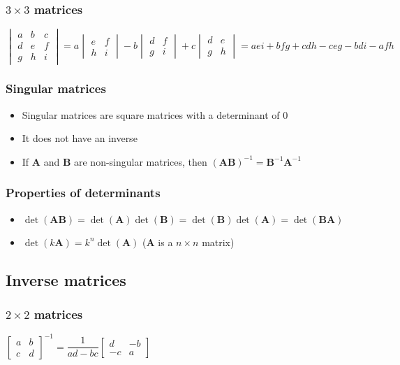 \subsubsection{$3\times3$ matrices}

$\begin{vmatrix}a&b&c\\d&e&f\\g&h&i\end{vmatrix}=a\begin{vmatrix}e&f\\h&i\end{vmatrix}-b\begin{vmatrix}d&f\\g&i\end{vmatrix}+c\begin{vmatrix}d&e\\g&h\end{vmatrix}=aei+bfg+cdh-ceg-bdi-afh$

\subsubsection{Singular matrices}
\begin{itemize}
	\item Singular matrices are square matrices with a determinant of 0
	\item It does not have an inverse
	\item If $\mathbf{A}$ and $\mathbf{B}$ are non-singular matrices, then $(\mathbf{AB})^{-1}=\mathbf{B}^{-1}\mathbf{A}^{-1}$
\end{itemize}



\subsubsection{Properties of determinants}
\begin{itemize}
	\item $\det(\mathbf{AB})=\det(\mathbf{A})\det(\mathbf{B})=\det(\mathbf{B})\det(\mathbf{A})=\det(\mathbf{BA})$
	\item $\det(k\mathbf{A})=k^n\det(\mathbf{A})$ ($\mathbf{A}$ is a $n\times n$ matrix)
\end{itemize}


\subsection{Inverse matrices}
\subsubsection{$2\times2$ matrices}
$\begin{bmatrix}
	a & b\\c & d
\end{bmatrix}^{-1}=\dfrac{1}{ad-bc}\begin{bmatrix}
	d & -b\\-c & a
\end{bmatrix}$

